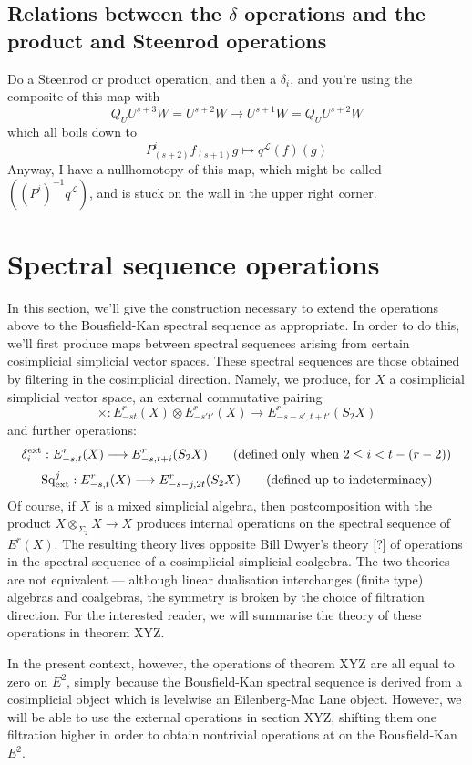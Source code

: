 \documentclass[11pt]{amsart}
\theoremstyle{plain}
\theoremstyle{definition}
\renewcommand{\to}{\longrightarrow}
\newcommand{\calL}{\mathcal{L}}
\theoremstyle{plain}
\newcommand{\Sq}{\mathrm{Sq}}
\begin{document}
\subsection{Relations between the $\delta$ operations and the product and Steenrod operations}

Do a Steenrod or product operation, and then a $\delta_i$, and you're using the composite of this map with
\[Q_UU^{s+3}W=U^{s+2}W\to U^{s+1}W=Q_UU^{s+2}W\]
which all boils down to
\[P^i_{(s+2)}f_{(s+1)}g\mapsto q^{\calL}(f)(g)\]
Anyway, I have a nullhomotopy of this map, which might be called $((P^i)^{-1}q^{\calL})$, and is stuck on the wall in the upper right corner.

\section{Spectral sequence operations}
In this section, we'll give the construction necessary to extend the operations above to the Bousfield-Kan spectral sequence as appropriate. In order to do this, we'll first produce maps between spectral sequences arising from certain cosimplicial simplicial vector spaces. These spectral sequences are those obtained by filtering in the cosimplicial direction. Namely, we produce, for $X$ a cosimplicial simplicial vector space, an external commutative pairing
\[\times:E^r_{-st}(X)\otimes E^r_{-s't'}(X)\to E^r_{-s-s',t+t'}(S_2X)\]
and further operations:
\[\delta_i^\textup{ext}:E^r_{-s,t}(X)\to E^r_{-s,t+i}(S_2X)\textup{\qquad (defined only when $2\leq i<t-(r-2)$)}\]
\[\Sq^j_\textup{ext}:E^r_{-s,t}(X)\to E^r_{-s-j,2t}(S_2X)\textup{\qquad (defined up to indeterminacy)}\]
Of course, if $X$ is a mixed simplicial algebra, then postcomposition with the product $X\otimes_{\Sigma_2}X\to X$ produces internal operations on the spectral sequence of $E^r(X)$. The resulting theory lives opposite Bill Dwyer's theory [?] of operations in the spectral sequence of a cosimplicial simplicial coalgebra. The two theories are not equivalent --- although linear dualisation interchanges (finite type) algebras and coalgebras, the symmetry is broken by the choice of filtration direction. For the interested reader, we will summarise the theory of these operations in theorem XYZ.

In the present context, however, the operations of theorem XYZ are all equal to zero on $E^2$, simply because the Bousfield-Kan spectral sequence is derived from a cosimplicial object which is levelwise an Eilenberg-Mac Lane object. However, we will be able to use the external operations in section XYZ, shifting them one filtration higher in order to obtain nontrivial operations at on the Bousfield-Kan $E^2$.
\end{document}
